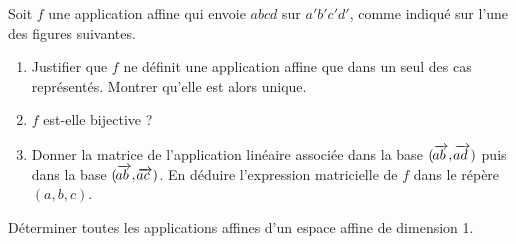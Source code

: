 \ee
\medskip
\be
Soit $f$ une application affine qui envoie $abcd$ sur $a'b'c'd'$, comme indiqu\'e sur l'une des figures suivantes.
\begin{enumerate}
\item Justifier que $f$ ne d\'efinit  une application affine  que dans un seul des cas repr\'esent\'es.  Montrer qu'elle est alors unique. 
\item $f$ est-elle bijective ?
\item Donner la matrice de l'application lin\'eaire associ\'ee dans la base $(\overrightarrow{\kern-1ptab\kern 2pt},\overrightarrow{\kern-1ptad\kern 2pt})$ puis dans la base $(\overrightarrow{\kern-1ptab\kern 2pt},\overrightarrow{\kern-1ptac\kern 2pt})$. En d\'eduire l'expression matricielle de $f$ dans le r\'ep\`ere $(a,b,c)$. \end{enumerate} 
\ee
\medskip
\be
D\'eterminer toutes les applications affines d'un espace affine de dimension 1.
\ee
\newpage
